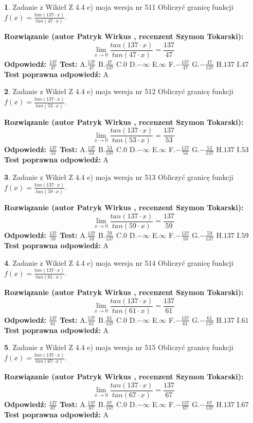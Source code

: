 \documentclass[12pt, a4paper]{article}
\theoremstyle{definition} %
\newtheorem{zad}{}
\newcommand{\zadStart}[1]{\begin{zad}#1\newline}
\newcommand{\zadStop}{\end{zad}}
\newcommand{\rozwStart}[2]{\noindent \textbf{Rozwiązanie (autor #1 , recenzent #2): }\newline}
\newcommand{\rozwStop}{\newline}
\newcommand{\odpStart}{\noindent \textbf{Odpowiedź:}\newline}
\newcommand{\odpStop}{\newline}
\newcommand{\testStart}{\noindent \textbf{Test:}\newline}
\newcommand{\testStop}{\newline}
\newcommand{\kluczStart}{\noindent \textbf{Test poprawna odpowiedź:}\newline}
\newcommand{\kluczStop}{\newline}
\begin{document}
\zadStart{Zadanie z Wikieł Z 4.4 e) moja wersja nr 511}
Obliczyć granicę funkcji $f(x)=\frac{tan(137\cdot x)}{tan(47\cdot x)}$.
\zadStop
\rozwStart{Patryk Wirkus}{Szymon Tokarski}
$$\lim\limits_{x\to 0}\frac{tan(137\cdot x)}{tan(47\cdot x)}=
\frac{137}{47}$$
\rozwStop
\odpStart
$\frac{137}{47}$
\odpStop
\testStart
A.$\frac{137}{47}$
B.$\frac{47}{137}$
C.$0$
D.$-\infty$
E.$\infty$
F.$-\frac{137}{47}$
G.$-\frac{47}{137}$
H.$137$
I.$47$
\testStop
\kluczStart
A
\kluczStop



\zadStart{Zadanie z Wikieł Z 4.4 e) moja wersja nr 512}
Obliczyć granicę funkcji $f(x)=\frac{tan(137\cdot x)}{tan(53\cdot x)}$.
\zadStop
\rozwStart{Patryk Wirkus}{Szymon Tokarski}
$$\lim\limits_{x\to 0}\frac{tan(137\cdot x)}{tan(53\cdot x)}=
\frac{137}{53}$$
\rozwStop
\odpStart
$\frac{137}{53}$
\odpStop
\testStart
A.$\frac{137}{53}$
B.$\frac{53}{137}$
C.$0$
D.$-\infty$
E.$\infty$
F.$-\frac{137}{53}$
G.$-\frac{53}{137}$
H.$137$
I.$53$
\testStop
\kluczStart
A
\kluczStop



\zadStart{Zadanie z Wikieł Z 4.4 e) moja wersja nr 513}
Obliczyć granicę funkcji $f(x)=\frac{tan(137\cdot x)}{tan(59\cdot x)}$.
\zadStop
\rozwStart{Patryk Wirkus}{Szymon Tokarski}
$$\lim\limits_{x\to 0}\frac{tan(137\cdot x)}{tan(59\cdot x)}=
\frac{137}{59}$$
\rozwStop
\odpStart
$\frac{137}{59}$
\odpStop
\testStart
A.$\frac{137}{59}$
B.$\frac{59}{137}$
C.$0$
D.$-\infty$
E.$\infty$
F.$-\frac{137}{59}$
G.$-\frac{59}{137}$
H.$137$
I.$59$
\testStop
\kluczStart
A
\kluczStop



\zadStart{Zadanie z Wikieł Z 4.4 e) moja wersja nr 514}
Obliczyć granicę funkcji $f(x)=\frac{tan(137\cdot x)}{tan(61\cdot x)}$.
\zadStop
\rozwStart{Patryk Wirkus}{Szymon Tokarski}
$$\lim\limits_{x\to 0}\frac{tan(137\cdot x)}{tan(61\cdot x)}=
\frac{137}{61}$$
\rozwStop
\odpStart
$\frac{137}{61}$
\odpStop
\testStart
A.$\frac{137}{61}$
B.$\frac{61}{137}$
C.$0$
D.$-\infty$
E.$\infty$
F.$-\frac{137}{61}$
G.$-\frac{61}{137}$
H.$137$
I.$61$
\testStop
\kluczStart
A
\kluczStop



\zadStart{Zadanie z Wikieł Z 4.4 e) moja wersja nr 515}
Obliczyć granicę funkcji $f(x)=\frac{tan(137\cdot x)}{tan(67\cdot x)}$.
\zadStop
\rozwStart{Patryk Wirkus}{Szymon Tokarski}
$$\lim\limits_{x\to 0}\frac{tan(137\cdot x)}{tan(67\cdot x)}=
\frac{137}{67}$$
\rozwStop
\odpStart
$\frac{137}{67}$
\odpStop
\testStart
A.$\frac{137}{67}$
B.$\frac{67}{137}$
C.$0$
D.$-\infty$
E.$\infty$
F.$-\frac{137}{67}$
G.$-\frac{67}{137}$
H.$137$
I.$67$
\testStop
\kluczStart
A
\kluczStop
\end{document}
